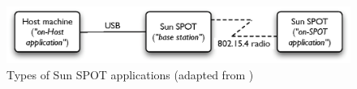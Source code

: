   
\begin{figure}
\centering
\includegraphics[width=\textwidth]{img/SunSPOTS_applications.eps} 
\caption[Types of Sun SPOT applications]{Types of Sun SPOT applications (adapted from
\cite{sun_developer:2008})}
\label{Fig:SunSPOTS_applications}
\end{figure}   
  